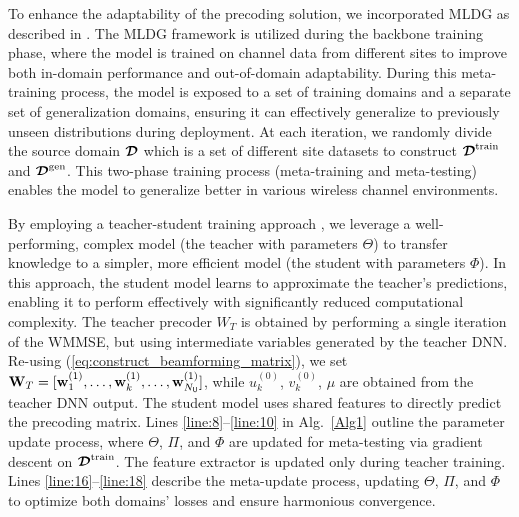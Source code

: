 To enhance the adaptability of the precoding solution, we incorporated \gls{MLDG} as described in \cite{10624768}. The \gls{MLDG} framework is utilized during the backbone training phase, where the model is trained on channel data from different sites to improve both in-domain performance and out-of-domain adaptability. During this meta-training process, the model is exposed to a set of training domains and a separate set of generalization domains, ensuring it can effectively generalize to previously unseen distributions during deployment. At each iteration, we randomly divide the source domain $\boldsymbol{\mathcal{D}}$ which is a set of different site datasets to construct $\boldsymbol{\mathcal{D}}^{\text{train}}$ and $\boldsymbol{\mathcal{D}}^{\text{gen}}$. This two-phase training process (meta-training and meta-testing) enables the model to generalize better in various wireless channel environments. 

By employing a teacher-student training approach \cite{hu2023teacher}, we leverage a well-performing, complex model (the teacher with parameters $\Theta$) to transfer knowledge to a simpler, more efficient model (the student with parameters $\Phi$). In this approach, the student model learns to approximate the teacher's predictions, enabling it to perform effectively with significantly reduced computational complexity. 
The teacher precoder $W_T$ is obtained by performing a single iteration of the WMMSE, but using intermediate variables generated by the teacher DNN. Re-using (\ref{eq:construct_beamforming_matrix}), we set $\mathbf{W}_T = [\mathbf{w}_1^{(1)}, \dots, \mathbf{w}_k^{(1)}, \dots, \mathbf{w}_{N_{\sf{U}}}^{(1)}]$, while $u_k^{(0)}$, $v_k^{(0)}$, $\mu$ are obtained from the teacher DNN output. 
The student model uses shared features to directly predict the precoding matrix. Lines \ref{line:8}--\ref{line:10} in Alg.~\ref{Alg1} outline the parameter update process, where \(\Theta\), \(\Pi\), and \(\Phi\) are updated for meta-testing via gradient descent on \(\boldsymbol{\mathcal{D}}^{\text{train}}\). The feature extractor is updated only during teacher training. Lines \ref{line:16}--\ref{line:18} describe the meta-update process, updating \(\Theta\), \(\Pi\), and \(\Phi\) to optimize both domains’ losses and ensure harmonious convergence.


